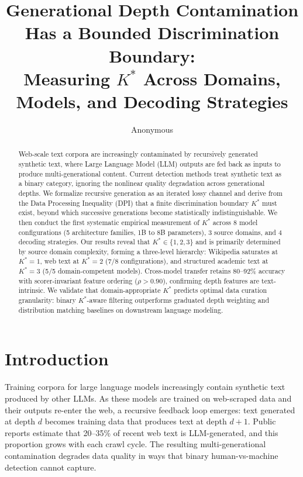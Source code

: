 \documentclass[11pt,a4paper]{article}
\title{Generational Depth Contamination Has a Bounded Discrimination Boundary:\\Measuring $K^{*}$ Across Domains, Models, and Decoding Strategies}
\author{Anonymous}
\newcommand{\Kstar}{K^{*}}
\begin{document}
\maketitle

\begin{abstract}
Web-scale text corpora are increasingly contaminated by recursively generated synthetic text, where Large Language Model (LLM) outputs are fed back as inputs to produce multi-generational content. Current detection methods treat synthetic text as a binary category, ignoring the nonlinear quality degradation across generational depths. We formalize recursive generation as an iterated lossy channel and derive from the Data Processing Inequality (DPI) that a finite discrimination boundary $\Kstar$ must exist, beyond which successive generations become statistically indistinguishable. We then conduct the first systematic empirical measurement of $\Kstar$ across 8 model configurations (5 architecture families, 1B to 8B parameters), 3 source domains, and 4 decoding strategies. Our results reveal that $\Kstar \in \{1,2,3\}$ and is primarily determined by source domain complexity, forming a three-level hierarchy: Wikipedia saturates at $\Kstar=1$, web text at $\Kstar=2$ (7/8 configurations), and structured academic text at $\Kstar=3$ (5/5 domain-competent models). Cross-model transfer retains 80--92\% accuracy with scorer-invariant feature ordering ($\rho > 0.90$), confirming depth features are text-intrinsic. We validate that domain-appropriate $\Kstar$ predicts optimal data curation granularity: binary $\Kstar$-aware filtering outperforms graduated depth weighting and distribution matching baselines on downstream language modeling.
\end{abstract}

\section{Introduction}

Training corpora for large language models increasingly contain synthetic text produced by other LLMs. As these models are trained on web-scraped data and their outputs re-enter the web, a recursive feedback loop emerges: text generated at depth $d$ becomes training data that produces text at depth $d+1$. Public reports estimate that 20--35\% of recent web text is LLM-generated, and this proportion grows with each crawl cycle. The resulting multi-generational contamination degrades data quality in ways that binary human-vs-machine detection cannot capture.
\end{document}
